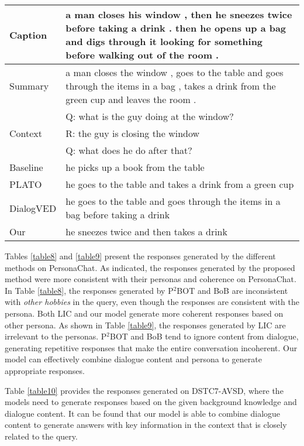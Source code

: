 \documentclass[letterpaper]{article} \usepackage{aaai23}  \usepackage{times}  \usepackage{helvet}  \usepackage{courier}  \usepackage[hyphens]{url}  \usepackage{graphicx} \urlstyle{rm} \def\UrlFont{\rm}  \usepackage{natbib}  \usepackage{caption} \frenchspacing  \setlength{\pdfpagewidth}{8.5in}  \setlength{\pdfpageheight}{11in}  \usepackage{algorithm}
\begin{document}
\begin{table*}[ht]
  \centering
    \begin{tabular}{lp{30em}}
    \toprule
    Caption & a man closes his window , then he sneezes twice before taking a drink . then he opens up a bag and digs through it looking for something before walking out of the room . \\
    \midrule
    Summary & a man closes the window , goes to the table and goes through the items in a bag , takes a drink from the green cup and leaves the room . \\
    \midrule
    \multirow{3}[6]{*}{Context} & Q: what is the guy doing at the window? \\
\cmidrule{2-2}     & R: the guy is closing the window \\
\cmidrule{2-2}     & Q: what does he do after that? \\
\bottomrule
    \toprule
    Baseline & he picks up a book from the table \\
    \midrule
    PLATO & he goes to the table and takes a drink from a green cup \\
    \midrule
    DialogVED & he goes to the table and goes through the items in a bag before taking a drink \\
    \midrule
    Our   & he sneezes twice and then takes a drink \\
    \bottomrule
    \end{tabular}\caption{Case analysis of response generation on the DSTC7-AVSD.}
\label{table10}\end{table*}Tables \ref{table8} and \ref{table9} present the responses generated by the different methods on PersonaChat. As indicated, the responses generated by the proposed method were more consistent with their personas and coherence on PersonaChat. In Table \ref{table8}, the responses generated by P$^2$BOT and BoB are inconsistent with \textit{other hobbies} in the query, even though the responses are consistent with the persona. Both LIC and our model generate more coherent responses based on other persona. As shown in Table \ref{table9}, the responses generated by LIC are irrelevant to the personas. P$^2$BOT and BoB tend to ignore content from dialogue, generating repetitive responses that make the entire conversation incoherent. Our model can effectively combine dialogue content and persona to generate appropriate responses.

Table \ref{table10} provides the responses generated on DSTC7-AVSD, where the models need to generate responses based on the given background knowledge and dialogue content. It can be found that our model is able to combine dialogue content to generate answers with key information in the context that is closely related to the query.
\end{document}
